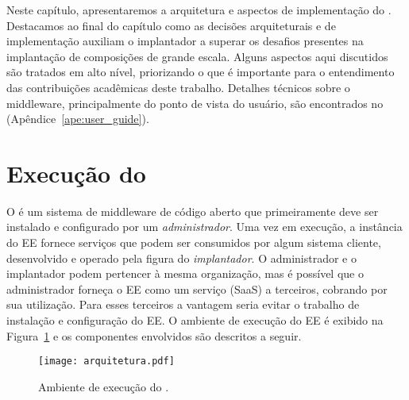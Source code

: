 Neste capítulo, apresentaremos a arquitetura e aspectos de implementação do \ee.   
Destacamos ao final do capítulo
como as decisões arquiteturais e de implementação auxiliam o implantador
a superar os desafios presentes na implantação de composições de grande escala.
Alguns aspectos aqui discutidos são tratados em alto nível,
priorizando o que é importante para o entendimento das contribuições
acadêmicas deste trabalho.
Detalhes técnicos sobre o middleware, principalmente do ponto de vista do
usuário, são encontrados no \userguide (Apêndice~\ref{ape:user_guide}).

\section{Execução do \ee}

O \ee é um sistema de middleware de código aberto que primeiramente deve ser instalado e configurado por um \emph{administrador}.
Uma vez em execução, a instância do EE fornece serviços que podem ser consumidos por algum sistema cliente, desenvolvido
e operado pela figura do \emph{implantador}. O administrador e o implantador podem pertencer à mesma organização,
mas é possível que o administrador forneça o EE como um serviço (SaaS) a terceiros, cobrando por sua utilização.
Para esses terceiros a vantagem seria evitar o trabalho de instalação e configuração do EE.
O ambiente de execução do EE é exibido na Figura~\ref{fig:arquitetura} e os componentes envolvidos são descritos a seguir.

\begin{figure}[ht]
\centering
\texttt{[image: arquitetura.pdf]}
\caption{Ambiente de execução do \choreos \ee.}
\label{fig:arquitetura}
\end{figure}

